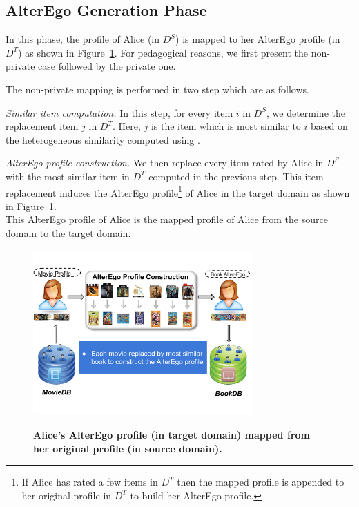 \subsection{AlterEgo Generation Phase}
In this phase, the profile of Alice (in $D^S$) is mapped to her AlterEgo profile (in $D^T$) as shown in Figure~\ref{fig:alterego}. For pedagogical reasons, we first present the non-private case followed by the private one.

 The non-private mapping is performed in two step which are as follows.

{\it Similar item computation.} In this step, for every item $i$ in $D^S$, we determine the replacement item $j$ in $D^T$. Here, $j$ is the item which is most similar to $i$ based on the heterogeneous similarity computed using \graphsim.


{\it AlterEgo profile construction.} We then replace every item rated by Alice in $D^S$ with the most similar item in $D^T$ computed in the previous step. This item replacement induces the AlterEgo profile\footnote{If Alice has rated a few items in $D^T$ then the mapped profile is appended to her original profile in $D^T$ to build her AlterEgo profile.} of Alice in the target domain as shown in Figure~\ref{fig:alterego}.\\
This AlterEgo profile of Alice is the mapped profile of Alice from the source domain to the target domain.
\begin{figure}[!htb]
\begin{center}
\vspace{-7mm}
\includegraphics[height=2.5in,width=3.3in]{figures/AlterEgo.png}
\vspace{-12mm}
\caption{{\bf Alice's AlterEgo profile (in target domain) mapped from her original profile (in source domain).}}
\vspace{-2mm}
\label{fig:alterego}
\end{center}
\end{figure}

